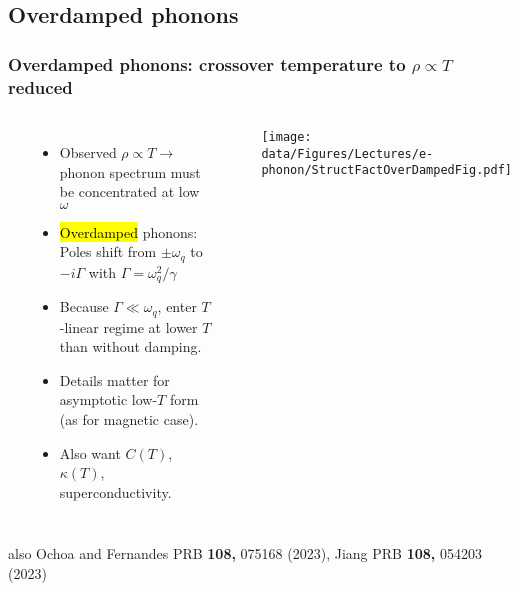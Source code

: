 \subsection{Overdamped phonons}
\begin{frame}[label=T1Origin]
    \frametitle{Overdamped phonons: crossover temperature to $\rho \propto  T$ reduced}
    
    \begin{columns}[t]
    \centerline{~}
    \vspace{-1.5em}
 
    \begin{itemize}
        \setlength\itemsep{0.5em}
    \item
    Observed $\rho \propto T \rightarrow$ \\
    phonon spectrum must be concentrated at low $\omega$
    \item \hl{Overdamped} phonons: 
    Poles shift from $\pm\omega_q$ to $-i\Gamma$ with $\Gamma=\omega_q^2/\gamma$
    \item
    Because $\Gamma \ll \omega_q$, enter $T$-linear regime at lower $T$ than without damping.
    \item Details matter for asymp\-totic low-$T$ form (as for magnetic case).
    \item Also want $C(T)$, $\kappa(T)$, superconductivity.
    \end{itemize}
    
    
    \centerline{~}
    \centerline{\texttt{[image: \\data/Figures/Lectures/e-phonon/StructFactOverDampedFig.pdf]}}
    
    \end{columns}
    \vspace*{\fill}
    \centerline{\makebox[\linewidth]{\rule{0.85\textwidth}{0.4pt}}}
    \centerline{\scriptsize also Ochoa and Fernandes PRB {\bf 108,} 075168 (2023), Jiang PRB {\bf 108,} 054203 (2023)}
\end{frame}
    
    




